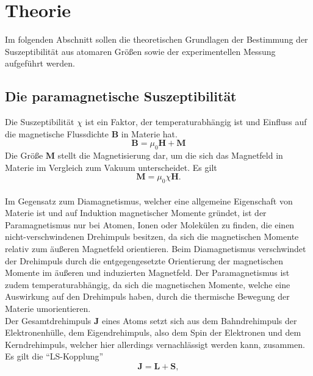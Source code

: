 \section{Theorie}

    Im folgenden Abschnitt sollen die theoretischen Grundlagen der Bestimmung der Suszeptibilität aus atomaren Größen
    sowie der experimentellen Messung aufgeführt werden.

\subsection{Die paramagnetische Suszeptibilität}

    Die Suszeptibilität $\chi$ ist ein Faktor,
    der temperaturabhängig ist
    und Einfluss auf die magnetische Flussdichte $\symbf{B}$ in Materie hat.
    \begin{equation*}
        \symbf{B} = \mu_0 \symbf{H} + \symbf{M}
    \end{equation*}
    Die Größe $\symbf{M}$ stellt die Magnetisierung dar,
    um die sich das Magnetfeld in Materie im Vergleich zum Vakuum unterscheidet.
    Es gilt
    \begin{equation}
        \label{eqn:Magnetisierung}
        \symbf{M} = \mu_0 \chi \symbf{H} .
    \end{equation}
    \\
    Im Gegensatz zum Diamagnetismus,
    welcher eine allgemeine Eigenschaft von Materie ist und auf Induktion magnetischer Momente gründet,
    ist der Paramagnetismus nur bei Atomen, Ionen oder Molekülen zu finden,
    die einen nicht-verschwindenen Drehimpuls besitzen,
    da sich die magnetischen Momente relativ zum äußeren Magnetfeld orientieren.
    Beim Diamagnetismus verschwindet der Drehimpuls durch die entgegengesetzte Orientierung der magnetischen Momente
    im äußeren und induzierten Magnetfeld.
    Der Paramagnetismus ist zudem temperaturabhängig,
    da sich die magnetischen Momente,
    welche eine Auswirkung auf den Drehimpuls haben,
    durch die thermische Bewegung der Materie umorientieren.\\
    Der Gesamtdrehimpuls $\symbf{J}$ eines Atoms setzt sich aus dem Bahndrehimpuls der Elektronenhülle,
    dem Eigendrehimpuls, also dem Spin der Elektronen und dem Kerndrehimpuls,
    welcher hier allerdings vernachlässigt werden kann,
    zusammen.\\
    Es gilt die \enquote{LS-Kopplung}
    \begin{equation*}
        \symbf{J} = \symbf{L} + \symbf{S} ,
    \end{equation*}
